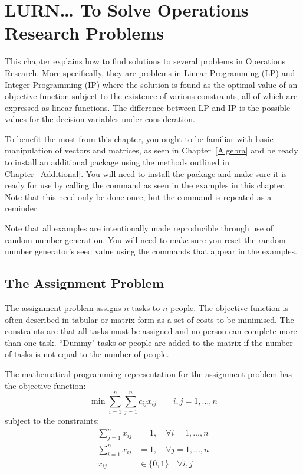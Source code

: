 

\chapter{LURN\ldots{} To Solve Operations Research Problems}
\label{OperRes}




This chapter explains how to find solutions to several problems in Operations Research. More specifically, they are problems in Linear Programming (LP) and Integer Programming (IP) where the solution is found as the optimal value of an objective function subject to the existence of various constraints, all of which are expressed as linear functions. The difference between LP and IP is the possible values for the decision variables under consideration.

To benefit the most from this chapter, you ought to be familiar with basic manipulation of vectors and matrices, as seen in Chapter~\ref{Algebra}  and be ready to install an additional package using the methods outlined in Chapter~\ref{Additional}. You will need to install the  package and make sure it is ready for use by calling the  command as seen in the examples in this chapter. Note that this need only be done once, but the command is repeated as a reminder.

Note that all examples are intentionally made reproducible through use of random number generation. You will need to make sure you reset the random number generator's seed value using the  commands that appear in the examples.


\section{The Assignment Problem}

The assignment problem assigns $n$ tasks to $n$ people. The objective function is often described in tabular or matrix form as a set of costs to be minimised. The constraints are that all tasks must be assigned and no person can complete more than one task. ``Dummy" tasks or people are added to the matrix if the number of tasks is not equal to the number of people. 

The mathematical programming representation for the assignment problem has the objective function:\begin{equation}\label{OperResAssObj}
\min{ \sum_{i=1}^n {\sum_{j=1}^n {c_{ij}x_{ij}}}} \qquad i,j=1,\ldots,n
\end{equation}
subject to the constraints:
\begin{eqnarray*}
\sum_{j=1}^n {x_{ij}} &=1, \quad \forall  i=1,\ldots,n\\
\sum_{i=1}^n {x_{ij}} &=1, \quad \forall j=1,\ldots,n\\
x_{ij} &\in \{0,1\} \quad \forall i,j\\
\end{eqnarray*}


